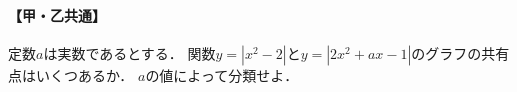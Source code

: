\documentclass[../../main.tex]{subfiles}
\begin{document}
\paragraph{【甲・乙共通】}
定数$a$は実数であるとする．
関数$y=|x^2-2|$と$y=|2x^2+ax-1|$のグラフの共有点はいくつあるか．
$a$の値によって分類せよ．
\end{document}
